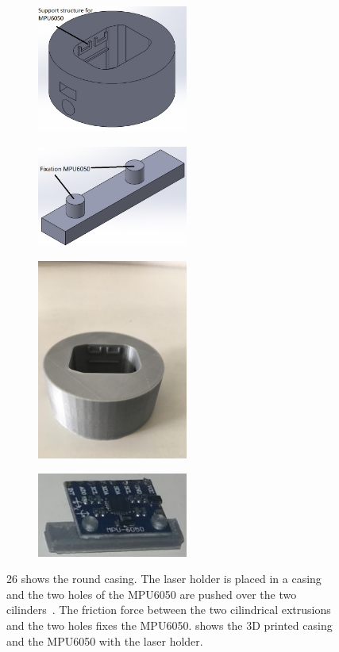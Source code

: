 \documentclass[whitelogo]{tudelft-report}
\begin{document}
{{{{\begin{figure}[H]
	\centering
	\begin{subfigure}{0.4\linewidth}
		\centering\includegraphics[width=140pt]{casing/bluno_beetle_casing_v8_round_design.JPG}
		\caption{\label{fig:fig1}}
	\end{subfigure}%
	\begin{subfigure}{0.4\linewidth}
		\centering\includegraphics[width=140pt]{casing/laser_holder.JPG}
		\caption{\label{fig:fig2}}
	\end{subfigure}  
	\begin{subfigure}{0.4\linewidth}
		\centering\includegraphics[width=140pt]{casing/bluno_beetle_casing_v8_round_design_picture.jpeg}
		\caption{\label{fig:fig3}}
	\end{subfigure}  
	\begin{subfigure}{0.4\linewidth}
	\centering\includegraphics[width=140pt]{casing/MU6050_with_laser_holder.jpg}
	\caption{\label{fig:fig4}}
	\end{subfigure}  
	\caption{26 shows the round casing. The laser holder is placed in a casing and the two holes of the MPU6050 are pushed over the two cilinders~. The friction force between the two cilindrical extrusions and the two holes fixes the MPU6050.  shows the 3D printed casing and  the MPU6050 with the laser holder.}
\end{figure}

}}}}
\end{document}
